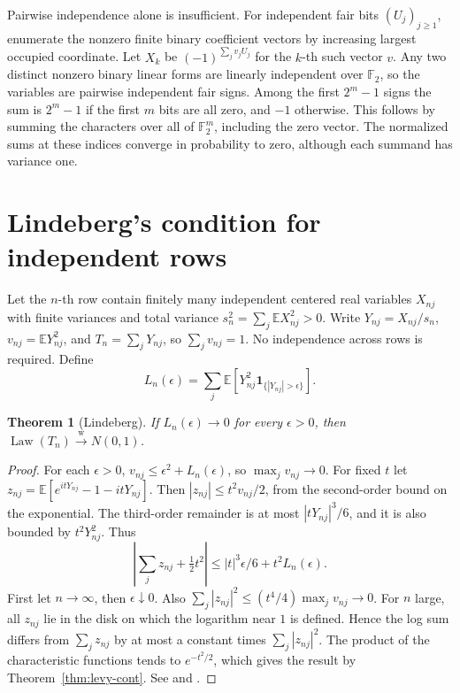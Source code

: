 \documentclass[11pt,oneside,openany]{book}
\newcommand{\E}{\mathbb{E}}
\DeclareMathOperator{\Law}{Law}
\newcommand{\ind}{\mathbf{1}}
\newcommand{\weakto}{\xrightarrow{\mathrm{w}}}
\theoremstyle{plain}
\newtheorem{theorem}{Theorem}[chapter]
\theoremstyle{definition}
\theoremstyle{remark}
\begin{document}
Pairwise independence alone is insufficient. For independent fair
bits \((U_j)_{j\ge1}\), enumerate the nonzero finite binary coefficient
vectors by increasing largest occupied coordinate. Let \(X_k\) be
\((-1)^{\sum_j v_j U_j}\) for the \(k\)-th such vector \(v\).
Any two distinct nonzero binary linear forms are linearly independent
over \(\mathbb F_2\), so the variables are pairwise independent fair signs.
Among the first \(2^m-1\) signs the sum is \(2^m-1\) if the first \(m\)
bits are all zero, and \(-1\) otherwise. This follows by summing the
characters over all of \(\mathbb F_2^m\), including the zero vector.
The normalized sums at these indices converge in probability to zero,
although each summand has variance one.

\section{Lindeberg's condition for independent rows}
\label{p09-02}

Let the \(n\)-th row contain finitely many independent centered real
variables \(X_{nj}\) with finite variances and total variance
\(s_n^2=\sum_j \E X_{nj}^2>0\). Write \(Y_{nj}=X_{nj}/s_n\),
\(v_{nj}=\E Y_{nj}^2\), and \(T_n=\sum_jY_{nj}\), so \(\sum_jv_{nj}=1\).
No independence across rows is required. Define
\[
 L_n(\epsilon)=\sum_j\E[Y_{nj}^2\ind_{\{|Y_{nj}|>\epsilon\}}] .
\]

\begin{theorem}[Lindeberg]\label{thm:lindeberg}
If \(L_n(\epsilon)\to0\) for every \(\epsilon>0\), then
\(\Law(T_n)\weakto N(0,1)\).
\end{theorem}

\begin{proof}
For each \(\epsilon>0\), \(v_{nj}\le\epsilon^2+L_n(\epsilon)\),
so \(\max_jv_{nj}\to0\).
For fixed \(t\) let \(z_{nj}=\E[e^{itY_{nj}}-1-itY_{nj}]\).
Then \(|z_{nj}|\le t^2v_{nj}/2\), from the second-order bound on
the exponential. The third-order remainder is at most
\(|tY_{nj}|^3/6\), and it is also bounded by \(t^2Y_{nj}^2\).
Thus
\[
 \left|\sum_j z_{nj}+\tfrac12t^2\right|
 \le |t|^3\epsilon/6+t^2 L_n(\epsilon).
\]
First let \(n\to\infty\), then \(\epsilon\downarrow0\).
Also \(\sum_j |z_{nj}|^2\le(t^4/4)\max_jv_{nj}\to0\).
For \(n\) large, all \(z_{nj}\) lie in the disk on which the logarithm
near \(1\) is defined. Hence the log sum differs from \(\sum_j z_{nj}\)
by at most a constant times \(\sum_j |z_{nj}|^2\).
The product of the characteristic functions tends to \(e^{-t^2/2}\),
which gives the result by Theorem~\ref{thm:levy-cont}.
See \cite[Theorem 3.4.10]{Durrett} and \cite[Theorem 6.13]{Kallenberg}.
\end{proof}
\end{document}
